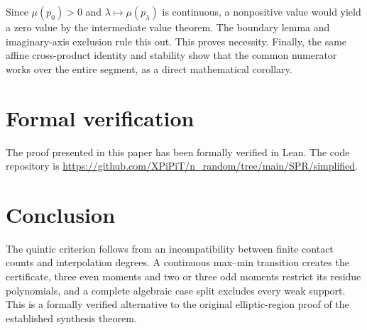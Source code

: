 \documentclass[11pt]{article}
\begin{document}
Since $\mu(p_0)>0$ and $\lambda\mapsto\mu(p_\lambda)$ is continuous, a nonpositive value would yield a zero value by the intermediate value theorem. The boundary lemma and imaginary-axis exclusion rule this out. This proves necessity. Finally, the same affine cross-product identity and stability show that the common numerator works over the entire segment, as a direct mathematical corollary.

\section{Formal verification}
The proof presented in this paper has been formally verified in Lean. The code repository is \url{https://github.com/XPiPiT/n_random/tree/main/SPR/simplified}.

\section{Conclusion}
The quintic criterion follows from an incompatibility between finite contact counts and interpolation degrees. A continuous max--min transition creates the certificate, three even moments and two or three odd moments restrict its residue polynomials, and a complete algebraic case split excludes every weak support. This is a formally verified alternative to the original elliptic-region proof of the established synthesis theorem.



\end{document}
